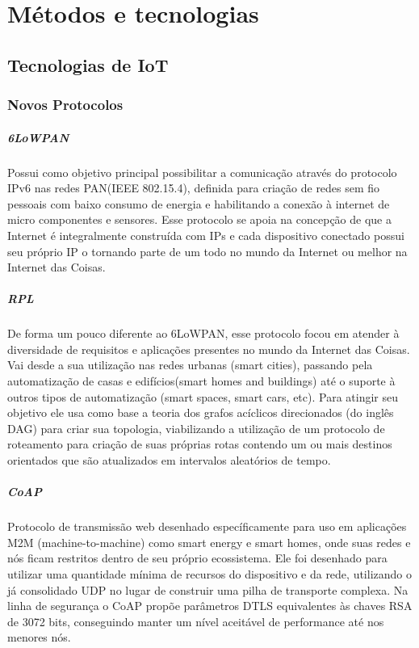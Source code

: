 \chapter{Métodos e tecnologias}

\section{Tecnologias de IoT}

\subsection{Novos Protocolos}
\paragraph{6LoWPAN}
Possui como objetivo principal possibilitar a comunica\c{c}\~ao atrav\'es do protocolo IPv6 nas redes PAN(IEEE 802.15.4), definida para cria\c{c}\~ao de redes sem fio pessoais com baixo consumo de energia e habilitando a conex\~ao \`a internet de micro componentes e sensores. Esse protocolo se apoia na concep\c{c}\~ao de que a Internet \'e integralmente constru\'ida com IPs e cada dispositivo conectado possui seu pr\'oprio IP o tornando parte de um todo no mundo da Internet ou melhor na Internet das Coisas.
\paragraph{RPL}
De forma um pouco diferente ao 6LoWPAN, esse protocolo focou em atender \`a diversidade de requisitos e aplica\c{c}\~oes presentes no mundo da Internet das Coisas. Vai desde a sua utiliza\c{c}\~ao nas redes urbanas (smart cities), passando pela automatiza\c{c}\~ao de casas e edif\'icios(smart homes and buildings) at\'e o suporte \`a outros tipos de automatiza\c{c}\~ao (smart spaces, smart cars, etc). Para atingir seu objetivo ele usa como base a teoria dos grafos ac\'iclicos direcionados (do ingl\^es DAG) para criar sua topologia, viabilizando a utiliza\c{c}\~ao de um protocolo de roteamento para cria\c{c}\~ao de suas pr\'oprias rotas contendo um ou mais destinos orientados que s\~ao atualizados em intervalos aleat\'orios de tempo.
\paragraph{CoAP}
Protocolo de transmiss\~ao web desenhado espec\'ificamente para uso em aplica\c{c}\~oes M2M (machine-to-machine) como smart energy e smart homes, onde suas redes e n\'os ficam restritos dentro de seu pr\'oprio ecossistema. Ele foi desenhado para utilizar uma quantidade m\'inima de recursos do dispositivo e da rede, utilizando o j\'a consolidado UDP no lugar de construir uma pilha de transporte complexa. Na linha de seguran\c{c}a o CoAP prop\~oe par\^ametros DTLS equivalentes \`as chaves RSA de 3072 bits, conseguindo manter um n\'ivel aceit\'avel de performance at\'e nos menores n\'os.
